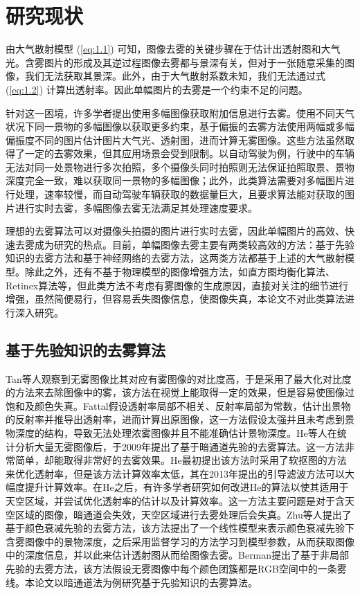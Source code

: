 \documentclass[a4paper, 12pt, oneside]{report}
\begin{document}
{\section{研究现状\quad}
由大气散射模型 (\ref{eq:1.1}) 可知，图像去雾的关键步骤在于估计出透射图和大气光。含雾图片的形成及其逆过程图像去雾都与景深有关，但对于一张随意采集的图像，我们无法获取其景深。此外，由于大气散射系数未知，我们无法通过式 (\ref{eq:1.2}) 计算出透射率。因此单幅图片的去雾是一个约束不足的问题。

针对这一困境，许多学者提出使用多幅图像获取附加信息进行去雾。\cite{ref3, ref5, ref6}使用不同天气状况下同一景物的多幅图像以获取更多约束，基于偏振的去雾方法\cite{ref7, ref8}使用两幅或多幅偏振度不同的图片估计图片大气光、透射图，进而计算无雾图像。这些方法虽然取得了一定的去雾效果，但其应用场景会受到限制。以自动驾驶为例，行驶中的车辆无法对同一处景物进行多次拍照，多个摄像头同时拍照则无法保证拍照取景、景物深度完全一致，难以获取同一景物的多幅图像；此外，此类算法需要对多幅图片进行处理，速率较慢，而自动驾驶车辆获取的数据量巨大，且要求算法能对获取的图片进行实时去雾，多幅图像去雾无法满足其处理速度要求。

理想的去雾算法可以对摄像头拍摄的图片进行实时去雾，因此单幅图片的高效、快速去雾成为研究的热点。目前，单幅图像去雾主要有两类较高效的方法：基于先验知识的去雾方法和基于神经网络的去雾方法，这两类方法都基于上述的大气散射模型。除此之外，还有不基于物理模型的图像增强方法，如直方图均衡化算法\cite{ref9}、Retinex算法\cite{ref10}等，但此类方法不考虑有雾图像的生成原因，直接对关注的细节进行增强，虽然简便易行，但容易丢失图像信息，使图像失真，本论文不对此类算法进行深入研究。

\subsection{基于先验知识的去雾算法\quad}
Tan\cite{ref11}等人观察到无雾图像比其对应有雾图像的对比度高，于是采用了最大化对比度的方法来去除图像中的雾，该方法在视觉上能取得一定的效果，但是容易使图像过饱和及颜色失真。Fattal\cite{ref12}假设透射率局部不相关、反射率局部为常数，估计出景物的反射率并推导出透射率，进而计算出原图像，这一方法假设太强并且未考虑到景物深度的结构，导致无法处理浓雾图像并且不能准确估计景物深度。He\cite{ref1}等人在统计分析大量无雾图像后，于2009年提出了基于暗通道先验的去雾算法。这一方法非常简单，却能取得非常好的去雾效果。He最初提出该方法时采用了软抠图的方法来优化透射率，但是该方法计算效率太低，其在2013年提出的引导滤波\cite{ref13}方法可以大幅度提升计算效率。在He之后，有许多学者研究如何改进He的算法以使其适用于天空区域，并尝试优化透射率的估计以及计算效率。这一方法主要问题是对于含天空区域的图像，暗通道会失效，天空区域进行去雾处理后会失真。Zhu\cite{ref14}等人提出了基于颜色衰减先验的去雾方法，该方法提出了一个线性模型来表示颜色衰减先验下含雾图像中的景物深度，之后采用监督学习的方法学习到模型参数，从而获取图像中的深度信息，并以此来估计透射图从而给图像去雾。Berman\cite{ref15}提出了基于非局部先验的去雾方法，该方法假设无雾图像中每个颜色团簇都是RGB空间中的一条雾线。本论文以暗通道法为例研究基于先验知识的去雾算法。

}
\end{document}
